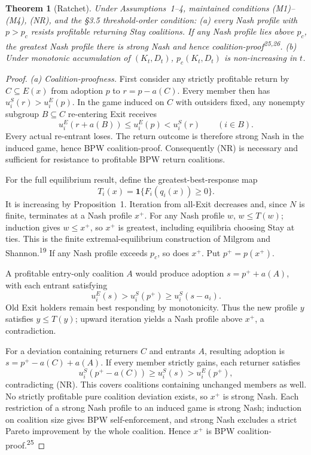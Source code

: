 \documentclass[12pt]{article}
\newtheorem{theorem}{Theorem}
\theoremstyle{definition}
\theoremstyle{remark}
\begin{document}
\begin{theorem}[Ratchet]
Under Assumptions~1--4, maintained conditions (M1)--(M4), (NR), and the \S3.5 threshold-order condition: (a) every Nash profile with $p>p_c$ resists profitable returning Stay coalitions. If any Nash profile lies above $p_c$, the greatest Nash profile there is strong Nash and hence coalition-proof\textsuperscript{25,26}. (b) Under monotonic accumulation of $(K_t,D_t)$, $p_c(K_t,D_t)$ is non-increasing in $t$.
\end{theorem}

\begin{proof}
\emph{(a) Coalition-proofness.} First consider any strictly profitable return by $C\subseteq E(x)$ from adoption $p$ to $r=p-a(C)$. Every member then has $u_i^S(r)>u_i^E(p)$. In the game induced on $C$ with outsiders fixed, any nonempty subgroup $B\subseteq C$ re-entering Exit receives
\[
 u_i^E(r+a(B))\le u_i^E(p)<u_i^S(r)\qquad(i\in B).
\]
Every actual re-entrant loses. The return outcome is therefore strong Nash in the induced game, hence BPW coalition-proof. Consequently (NR) is necessary and sufficient for resistance to profitable BPW return coalitions.

For the full equilibrium result, define the greatest-best-response map
\[
 T_i(x)=\mathbf{1}\{F_i(q_i(x))\ge0\}.
\]
It is increasing by Proposition~1. Iteration from all-Exit decreases and, since $N$ is finite, terminates at a Nash profile $x^+$. For any Nash profile $w$, $w\le T(w)$; induction gives $w\le x^+$, so $x^+$ is greatest, including equilibria choosing Stay at ties. This is the finite extremal-equilibrium construction of Milgrom and Shannon.\textsuperscript{19} If any Nash profile exceeds $p_c$, so does $x^+$. Put $p^+=p(x^+)$.

A profitable entry-only coalition $A$ would produce adoption $s=p^++a(A)$, with each entrant satisfying
\[
 u_i^E(s)>u_i^S(p^+)\ge u_i^S(s-a_i).
\]
Old Exit holders remain best responding by monotonicity. Thus the new profile $y$ satisfies $y\le T(y)$; upward iteration yields a Nash profile above $x^+$, a contradiction.

For a deviation containing returners $C$ and entrants $A$, resulting adoption is $s=p^+-a(C)+a(A)$. If every member strictly gains, each returner satisfies
\[
 u_i^S(p^+-a(C))\ge u_i^S(s)>u_i^E(p^+),
\]
contradicting (NR). This covers coalitions containing unchanged members as well. No strictly profitable pure coalition deviation exists, so $x^+$ is strong Nash. Each restriction of a strong Nash profile to an induced game is strong Nash; induction on coalition size gives BPW self-enforcement, and strong Nash excludes a strict Pareto improvement by the whole coalition. Hence $x^+$ is BPW coalition-proof.\textsuperscript{25}


\end{proof}
\end{document}
